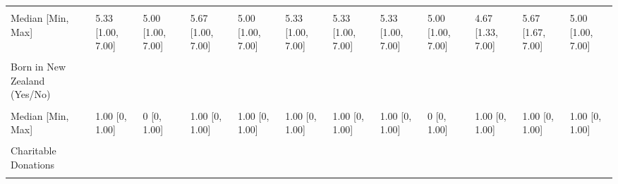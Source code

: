 \documentclass[
  single column]{article}
\begin{document}
\begin{landscape}
\begin{longtable}[t]{llllllllllll}
\cellcolor{gray!10}{Mean (SD)} & \cellcolor{gray!10}{5.11 (1.14)} & \cellcolor{gray!10}{4.83 (1.21)} & \cellcolor{gray!10}{5.37 (1.05)} & \cellcolor{gray!10}{4.99 (1.24)} & \cellcolor{gray!10}{5.26 (1.11)} & \cellcolor{gray!10}{5.19 (1.13)} & \cellcolor{gray!10}{5.23 (1.15)} & \cellcolor{gray!10}{4.99 (1.21)} & \cellcolor{gray!10}{4.65 (1.16)} & \cellcolor{gray!10}{5.38 (1.03)} & \cellcolor{gray!10}{4.84 (1.30)}\\
Median [Min, Max] & 5.33 [1.00, 7.00] & 5.00 [1.00, 7.00] & 5.67 [1.00, 7.00] & 5.00 [1.00, 7.00] & 5.33 [1.00, 7.00] & 5.33 [1.00, 7.00] & 5.33 [1.00, 7.00] & 5.00 [1.00, 7.00] & 4.67 [1.33, 7.00] & 5.67 [1.67, 7.00] & 5.00 [1.00, 7.00]\\
\addlinespace
\cellcolor{gray!10}{Missing} & \cellcolor{gray!10}{103 (0.5\%)} & \cellcolor{gray!10}{3 (0.5\%)} & \cellcolor{gray!10}{11 (0.8\%)} & \cellcolor{gray!10}{2 (0.7\%)} & \cellcolor{gray!10}{11 (0.5\%)} & \cellcolor{gray!10}{23 (0.6\%)} & \cellcolor{gray!10}{3 (0.3\%)} & \cellcolor{gray!10}{0 (0\%)} & \cellcolor{gray!10}{2 (2.3\%)} & \cellcolor{gray!10}{1 (0.2\%)} & \cellcolor{gray!10}{7 (0.9\%)}\\
Born in New Zealand (Yes/No) &  &  &  &  &  &  &  &  &  &  & \\
\cellcolor{gray!10}{Mean (SD)} & \cellcolor{gray!10}{0.794 (0.405)} & \cellcolor{gray!10}{0.230 (0.421)} & \cellcolor{gray!10}{0.831 (0.375)} & \cellcolor{gray!10}{0.587 (0.493)} & \cellcolor{gray!10}{0.786 (0.410)} & \cellcolor{gray!10}{0.776 (0.417)} & \cellcolor{gray!10}{0.747 (0.435)} & \cellcolor{gray!10}{0.441 (0.498)} & \cellcolor{gray!10}{0.667 (0.474)} & \cellcolor{gray!10}{0.890 (0.313)} & \cellcolor{gray!10}{0.779 (0.415)}\\
Median [Min, Max] & 1.00 [0, 1.00] & 0 [0, 1.00] & 1.00 [0, 1.00] & 1.00 [0, 1.00] & 1.00 [0, 1.00] & 1.00 [0, 1.00] & 1.00 [0, 1.00] & 0 [0, 1.00] & 1.00 [0, 1.00] & 1.00 [0, 1.00] & 1.00 [0, 1.00]\\
\cellcolor{gray!10}{Missing} & \cellcolor{gray!10}{25 (0.1\%)} & \cellcolor{gray!10}{37 (5.6\%)} & \cellcolor{gray!10}{2 (0.1\%)} & \cellcolor{gray!10}{1 (0.4\%)} & \cellcolor{gray!10}{1 (0.0\%)} & \cellcolor{gray!10}{10 (0.3\%)} & \cellcolor{gray!10}{0 (0\%)} & \cellcolor{gray!10}{0 (0\%)} & \cellcolor{gray!10}{0 (0\%)} & \cellcolor{gray!10}{1 (0.2\%)} & \cellcolor{gray!10}{2 (0.3\%)}\\
\addlinespace
Charitable Donations &  &  &  &  &  &  &  &  &  &  & \\
\cellcolor{gray!10}{Mean (SD)} & \cellcolor{gray!10}{705 (6140)} & \cellcolor{gray!10}{849 (2350)} & \cellcolor{gray!10}{1490 (5870)} & \cellcolor{gray!10}{1140 (4480)} & \cellcolor{gray!10}{956 (3930)} & \cellcolor{gray!10}{3570 (18500)} & \cellcolor{gray!10}{2750 (5270)} & \cellcolor{gray!10}{1210 (3330)} & \cellcolor{gray!10}{1590 (3570)} & \cellcolor{gray!10}{1180 (4510)} & \cellcolor{gray!10}{674 (3520)}\\

\end{longtable}
\end{landscape}
\end{document}
